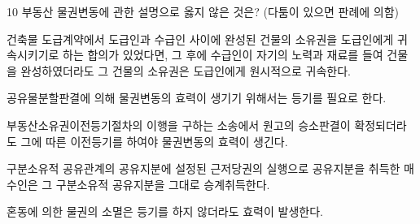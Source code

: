 \begin{question}{10}
부동산 물권변동에 관한 설명으로 옳지 않은 것은? (다툼이 있으면 판례에 의함)
\begin{choices}
  \item 건축물 도급계약에서 도급인과 수급인 사이에 완성된 건물의 소유권을 도급인에게 귀속시키기로 하는 합의가 있었다면, 그 후에 수급인이 자기의 노력과 재료를 들여 건물을 완성하였더라도 그 건물의 소유권은 도급인에게 원시적으로 귀속한다.
  \item 공유물분할판결에 의해 물권변동의 효력이 생기기 위해서는 등기를 필요로 한다.
  \item 부동산소유권이전등기절차의 이행을 구하는 소송에서 원고의 승소판결이 확정되더라도 그에 따른 이전등기를 하여야 물권변동의 효력이 생긴다.
  \item 구분소유적 공유관계의 공유지분에 설정된 근저당권의 실행으로 공유지분을 취득한 매수인은 그 구분소유적 공유지분을 그대로 승계취득한다.
  \item 혼동에 의한 물권의 소멸은 등기를 하지 않더라도 효력이 발생한다.
\end{choices}
\end{question}
